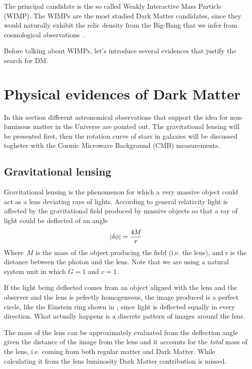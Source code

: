 The principal candidate is the so called Weakly Interactive Mass Particle (WIMP). The WIMPs are the most studied Dark Matter candidates, since they would naturally exhibit the relic density from the Big-Bang that we infer from cosmological observations~\cite{feng:DM}.

Before talking about WIMPs, let's introduce several evidences that justify the search for DM.

\section{Physical evidences of Dark Matter}
In this section different astronomical observations that support the idea for non-luminous matter in the Universe are pointed out. The gravitational lensing will be presented first, then the rotation curve of stars in galaxies will be discussed togheter with the Cosmic Microwave Background (CMB) measurements.

\subsection{Gravitational lensing}
Gravitational lensing is the phenomenon for which a very massive object could act as a lens deviating rays of lights. According to general relativity light is affected by the gravitational field produced by massive objects so that a ray of light could be deflected of an angle 
\begin{equation}
\lvert\delta\phi\rvert=\frac{4M}{r}
\end{equation}
Where $\,M$ is the mass of the object producing the field (i.e. the lens), and r is the distance between the photon and the lens. Note that we are using a natural system unit in which $G=1$ and $c=1$.

If the light being deflected comes from an object aligned with the lens and the observer and the lens is pefectly homogeneous, the image produced is a perfect circle, like the Einstein ring shown in \Fig{\ref{fig:einsteinring}}, since light is deflected equally in every direction. What actually happens is a discrete pattern of images around the lens.

The mass of the lens can be approximately evaluated from the deflection angle given the distance of the image from the lens and it accounts for the \emph{total} mass of the lens, i.e. coming from both regular matter and Dark Matter. While calculating it from the lens luminosity Dark Matter contribution is missed.

